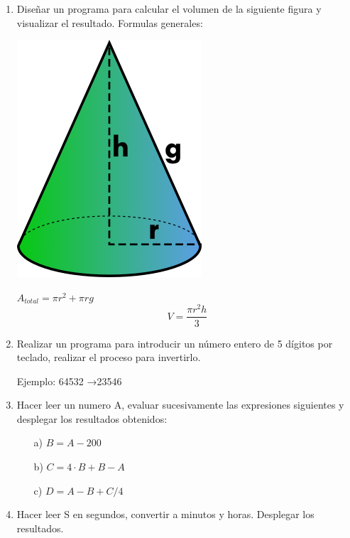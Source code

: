 \documentclass{scrartcl}
\begin{document}
\begin{enumerate}
		\item Diseñar un programa para calcular el volumen de la siguiente figura y visualizar el resultado. Formulas generales:
		
			\begin{minipage}{0.4\textwidth}
				\centering
				\includegraphics[scale=0.3]{img/cono.png}
			\end{minipage}
			\begin{minipage}{0.5\textwidth}
				\centering
				$A_{total}= \pi r^{2} + \pi r g$
				$$V=\frac{\pi r^{2} h}{3}$$
			\end{minipage}
		
		\item Realizar un programa para introducir un número entero de 5 dígitos por teclado, realizar el proceso para invertirlo.
		
		Ejemplo: 64532 →23546
		
		\item Hacer leer un numero A, evaluar sucesivamente las expresiones siguientes y desplegar los resultados obtenidos:
		
		\begin{itemize}
			\item [a)] $B=A-200$
			\item [b)] $C=4\cdot B+B-A$
			\item [c)] $D=A-B+C/4$
		\end{itemize}
		

		
		
		\item Hacer leer S en segundos, convertir a minutos y horas. Desplegar los resultados.
		

\end{enumerate}
\end{document}

